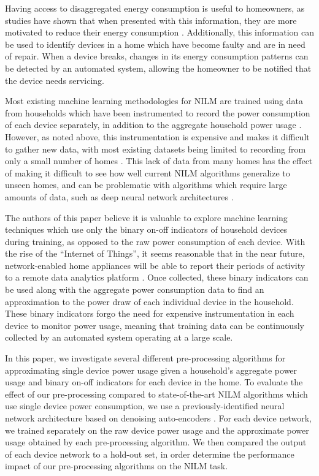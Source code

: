 \documentclass{article}
\begin{document}
Having access to disaggregated energy consumption is useful to homeowners, as studies have shown that when presented with this information, they are more motivated to reduce their energy consumption \cite{Darby}.
Additionally, this information can be used to identify devices in a home which have become faulty and are in need of repair.
When a device breaks, changes in its energy consumption patterns can be detected by an automated system, allowing the homeowner to be notified that the device needs servicing.

Most existing machine learning methodologies for NILM are trained using data from households which have been instrumented to record the power consumption of each device separately, in addition to the aggregate household power usage \cite{Kelly, Cicchetti}.
However, as noted above, this instrumentation is expensive and makes it difficult to gather new data, with most existing datasets being limited to recording from only a small number of homes \cite{Redd, Kelly2}.
This lack of data from many homes has the effect of making it difficult to see how well current NILM algorithms generalize to unseen homes, and can be problematic with algorithms which require large amounts of data, such as deep neural network architectures \cite{Kelly}.

The authors of this paper believe it is valuable to explore machine learning techniques which use only the binary on-off indicators of household devices during training, as opposed to the raw power consumption of each device.
With the rise of the ``Internet of Things'', it seems reasonable that in the near future, network-enabled home appliances will be able to report their periods of activity to a remote data analytics platform \cite{Gubbi}.
Once collected, these binary indicators can be used along with the aggregate power consumption data to find an approximation to the power draw of each individual device in the household.
These binary indicators forgo the need for expensive instrumentation in each device to monitor power usage, meaning that training data can be continuously collected by an automated system operating at a large scale.

In this paper, we investigate several different pre-processing algorithms for approximating single device power usage given a household's aggregate power usage and binary on-off indicators for each device in the home.
To evaluate the effect of our pre-processing compared to state-of-the-art NILM algorithms which use single device power consumption, we use a previously-identified neural network architecture based on denoising auto-encoders \cite{Kelly}.
For each device network, we trained separately on the raw device power usage and the approximate power usage obtained by each pre-processing algorithm.
We then compared the output of each device network to a hold-out set, in order determine the performance impact of our pre-processing algorithms on the NILM task.
\end{document}
